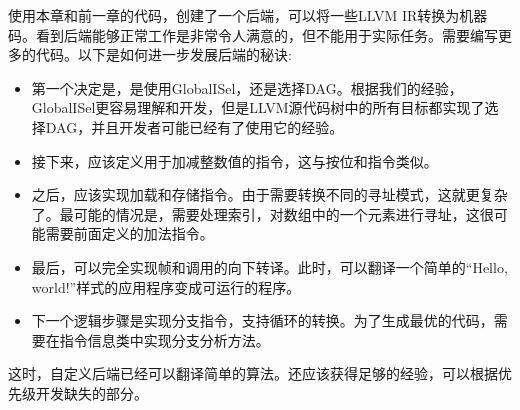 使用本章和前一章的代码，创建了一个后端，可以将一些LLVM IR转换为机器码。看到后端能够正常工作是非常令人满意的，但不能用于实际任务。需要编写更多的代码。以下是如何进一步发展后端的秘诀:

\begin{itemize}
\item
第一个决定是，是使用GlobalISel，还是选择DAG。根据我们的经验，GlobalISel更容易理解和开发，但是LLVM源代码树中的所有目标都实现了选择DAG，并且开发者可能已经有了使用它的经验。

\item
接下来，应该定义用于加减整数值的指令，这与按位和指令类似。

\item
之后，应该实现加载和存储指令。由于需要转换不同的寻址模式，这就更复杂了。最可能的情况是，需要处理索引，对数组中的一个元素进行寻址，这很可能需要前面定义的加法指令。

\item
最后，可以完全实现帧和调用的向下转译。此时，可以翻译一个简单的“Hello, world!”样式的应用程序变成可运行的程序。

\item
下一个逻辑步骤是实现分支指令，支持循环的转换。为了生成最优的代码，需要在指令信息类中实现分支分析方法。
\end{itemize}

这时，自定义后端已经可以翻译简单的算法。还应该获得足够的经验，可以根据优先级开发缺失的部分。

















